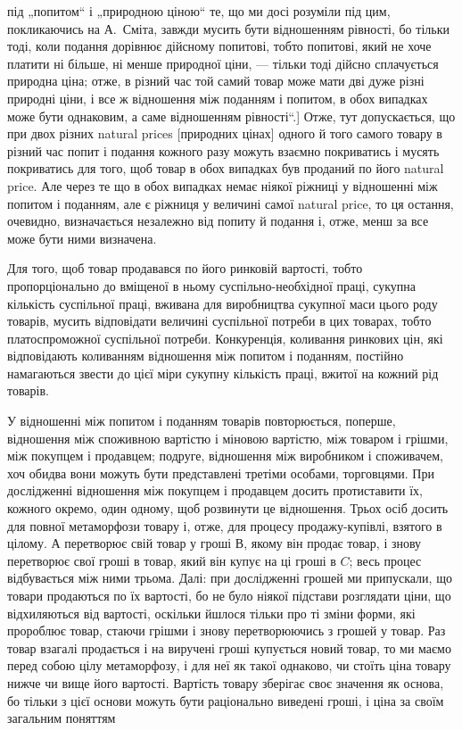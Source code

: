 \parcont{}  %
під „попитом“ і „природною ціною“ те, що ми досі розуміли під
цим, покликаючись на А.~Сміта, завжди мусить бути відношенням
рівності, бо тільки тоді, коли подання дорівнює дійсному
попитові, тобто попитові, який не хоче платити ні більше,
ні менше природної ціни, — тільки тоді дійсно сплачується природна
ціна; отже, в різний час той самий товар може мати дві
дуже різні природні ціни, і все ж відношення між поданням
і попитом, в обох випадках може бути однаковим, а саме
відношенням рівності“.] Отже, тут допускається, що при двох
різних natural prices [природних цінах] одного й того самого
товару в різний час попит і подання кожного разу можуть взаємно
покриватись і мусять покриватись для того, щоб товар
в обох випадках був проданий по його natural price. Але через
те що в обох випадках немає ніякої ріжниці у відношенні між
попитом і поданням, але є ріжниця у величині самої natural
price, то ця остання, очевидно, визначається незалежно від попиту
й подання і, отже, менш за все може бути ними визначена.

Для того, щоб товар продавався по його ринковій вартості,
тобто пропорціонально до вміщеної в ньому суспільно-необхідної
праці, сукупна кількість суспільної праці, вживана для
виробництва сукупної маси цього роду товарів, мусить відповідати
величині суспільної потреби в цих товарах, тобто платоспроможної
суспільної потреби. Конкуренція, коливання ринкових
цін, які відповідають коливанням відношення між попитом
і поданням, постійно намагаються звести до цієї міри сукупну
кількість праці, вжитої на кожний рід товарів.

У відношенні між попитом і поданням товарів повторюється,
поперше, відношення між споживною вартістю і міновою вартістю,
між товаром і грішми, між покупцем і продавцем; подруге,
відношення між виробником і споживачем, хоч обидва
вони можуть бути представлені третіми особами, торговцями.
При дослідженні відношення між покупцем і продавцем досить
протиставити їх, кожного окремо, один одному, щоб розвинути
це відношення. Трьох осіб досить для повної метаморфози
товару і, отже, для процесу продажу-купівлі, взятого в цілому.
$А$ перетворює свій товар у гроші $В$, якому він продає товар,
і знову перетворює свої гроші в товар, який він купує на ці
гроші в $C$; весь процес відбувається між ними трьома. Далі:
при дослідженні грошей ми припускали, що товари продаються
по їх вартості, бо не було ніякої підстави розглядати ціни, що
відхиляються від вартості, оскільки йшлося тільки про ті зміни
форми, які пророблює товар, стаючи грішми і знову перетворюючись
з грошей у товар. Раз товар взагалі продається і на
виручені гроші купується новий товар, то ми маємо перед
собою цілу метаморфозу, і для неї як такої однаково, чи стоїть
ціна товару нижче чи вище його вартості. Вартість товару зберігає
своє значення як основа, бо тільки з цієї основи можуть бути
раціонально виведені гроші, і ціна за своїм загальним поняттям
\parbreak{}  %

